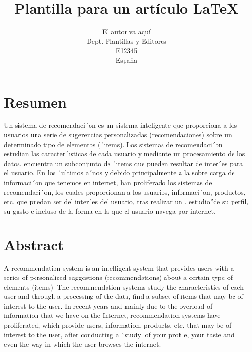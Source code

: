 %
%



\title{Plantilla para un artículo \LaTeX}
\author{El autor va aquí\\
  \small Dept. Plantillas y Editores\\
  \small E12345\\
  \small España
}


\section{Resumen}
\item{Un sistema de recomendaci´on es un sistema inteligente que proporciona a los usuarios una serie de sugerencias personalizadas (recomendaciones) sobre un determinado tipo de elementos (´ıtems). Los sistemas de recomendaci´on estudian las caracter´ısticas de cada usuario y mediante un procesamiento de los datos, encuentra un subconjunto de ´ıtems que pueden resultar de inter´es para el usuario. En los ´ultimos a˜nos y debido principalmente a la sobre carga de informaci´on que tenemos en internet, han proliferado los sistemas de recomendaci´on, los cuales proporcionan a los usuarios, informaci´on, productos, etc. que puedan ser del inter´es del usuario, tras realizar un . estudio”de su perfil, su gusto e incluso de la forma en la que el usuario navega por internet.

\section{Abstract}
\item{A recommendation system is an intelligent system that provides users with a series of personalized suggestions (recommendations) about a certain type of elements (items). The recommendation systems study the characteristics of each user and through a processing of the data, find a subset of items that may be of interest to the user. In recent years and mainly due to the overload of information that we have on the Internet, recommendation systems have proliferated, which provide users, information, products, etc. that may be of interest to the user, after conducting a ”study .of your profile, your taste and even the way in which the user browses the internet.
\newpage

}}
